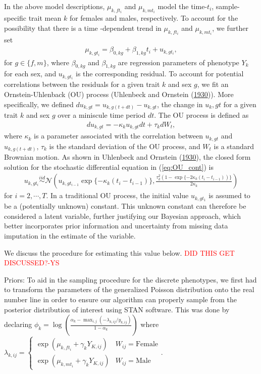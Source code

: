 \documentclass[
  12pt,
]{article}
\begin{document}
In the above model descriptions, \(\mu_{k,ft_i}\) and \(\mu_{k,mt_i}\)
model the time-\(t_i\), sample-specific trait mean \(k\) for females and
males, respectively. To account for the possibility that there is a time
-dependent trend in \(\mu_{k,ft_i}\) and \(\mu_{k,mt_i}\), we further
set \begin{align}
\mu_{k,gt_i} = \beta_{0,kg} + \beta_{1,kg}t_i + u_{k,gt_i},
\label{eq:mu}
\end{align} for \(g \in \{f,m\}\), where \(\beta_{0,kg}\) and
\(\beta_{1,kg}\) are regression parameters of phenotype \(Y_k\) for each
sex, and \(u_{k,gt_i}\) is the corresponding residual. To account for
potential correlations between the residuals for a given trait \(k\) and
sex \(g\), we fit an Ornstein-Uhlenback (OU) process (Uhlenbeck and
Ornstein (\protect\hyperlink{ref-OUProcess}{1930})). More specifically,
we defined \(du_{k,gt} = u_{k,g(t + dt)} - u_{k,gt}\), the change in
\(u_k,gt\) for a given trait \(k\) and sex \(g\) over a miniscule time
period \(dt\). The OU process is defined as \begin{align}
du_{k,gt} = -\kappa_k u_{k,gt} dt + \tau_k dW_t,
\label{eq:OU_cont}
\end{align} where \(\kappa_k\) is a parameter associated with the
correlation between \(u_{k,gt}\) and \(u_{k,g(t+dt)}\), \(\tau_k\) is
the standard deviation of the OU process, and \(W_t\) is a standard
Brownian motion. As shown in Uhlenbeck and Ornstein
(\protect\hyperlink{ref-OUProcess}{1930}), the closed form solution for
the stochastic differential equation in (\ref{eq:OU_cont}) is
\begin{align}
u_{k,gt_i} \overset{iid}{\sim}\mathcal{N}\left(u_{k,gt_{i-1}}\exp\{-\kappa_k(t_{i} - t_{i-1})\} , \frac{\tau_k^2(1 - \exp\{-2\kappa_k(t_{i} - t_{i-1}))\}}{2\kappa_k}\right)
\label{eq:OU_sol}
\end{align} for \(i = 2,\cdots,T\). In a traditional OU process, the
initial value \(u_{k,gt_1}\) is assumed to be a (potentially unknown)
constant. This unknown constant can therefore be considered a latent
variable, further justifying our Bayesian approach, which better
incorporates prior information and uncertainty from missing data
imputation in the estimate of the variable.

We discuss the procedure for estimating this value below.
\textcolor{red}{DID THIS GET DISCUSSED?-YS}

Priors: To aid in the sampling procedure for the discrete phenotypes, we
first had to transform the parameters of the generalized Poisson
distribution onto the real number line in order to ensure our algorithm
can properly sample from the posterior distribution of interest using
STAN software. This was done by declaring
\(\phi_k = \log\left(\frac{\alpha_k - \max_{i,j}(-\lambda_{k,ij}/y_{k,ij})}{1 - \alpha_k}\right)\)
where
\(\lambda_{k,ij} = \left\{\begin{array}{cc} \exp(\mu_{k,ft_i} + \gamma_k Y_{K,ij}) & W_{ij} = \text{Female} \\ \exp(\mu_{k,mt_i} + \gamma_k Y_{K,ij}) & W_{ij} = \text{Male} \end{array}\right.\).
\end{document}

